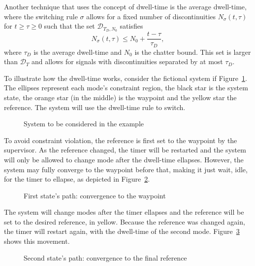 Another technique that uses the concept of dwell-time is the average dwell-time,
where the switching rule \(\sigma\) allows for a fixed number of discontinuities
\(N_{\sigma}(t,\tau)\) for \(t\ge{}\tau{}\ge{}0\) such that the set
\(\mathcal{D}_{T_{D},N_{0}}\) satisfies
%
\begin{equation}
	N_{\sigma}(t,\tau) \le{} N_{0} + \frac{t-\tau}{\tau_{D}},
\end{equation}
%
where \(\tau_{D}\) is the average dwell-time and \(N_{0}\) is the chatter bound.
This set is larger than \(\mathcal{D}_{T}\) and allows for signals with
discontinuities separated by at most \(\tau_{D}\).

To illustrate how the dwell-time works, consider the fictional system if
Figure~\ref{fig:dt-ex1}. The ellipses represent each mode's constraint region,
the black star is the system state, the orange star (in the middle) is the
waypoint and the yellow star the reference. The system will use the dwell-time
rule to switch.

\begin{figure}[!htb]
	\centering
	
	\caption{System to be considered in the example}%
	\label{fig:dt-ex1}
\end{figure}

To avoid constraint violation, the reference is first set to the waypoint by the
supervisor. As the reference changed, the timer will be restarted and the system
will only be allowed to change mode after the dwell-time ellapses. However, the
system may fully converge to the waypoint before that, making it just wait,
idle, for the timer to ellapse, as depicted in Figure~\ref{fig:dt-ex2}.

\begin{figure}[!htb]
	\centering
	
	\caption{First state's path: convergence to the waypoint}%
	\label{fig:dt-ex2}
\end{figure}

The system will change modes after the timer ellapses and the reference will be
set to the desired reference, in yellow. Because the reference was changed
again, the timer will restart again, with the dwell-time of the second mode.
Figure~\ref{fig:dt-ex3} shows this movement.

\begin{figure}[!htb]
	\centering
	
	\caption{Second state's path: convergence to the final reference}%
	\label{fig:dt-ex3}
\end{figure}


